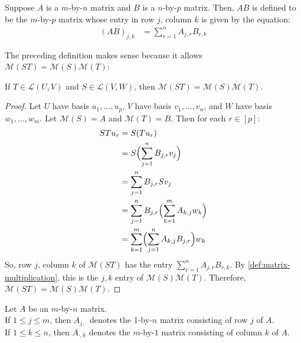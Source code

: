 \documentclass{article}
\begin{document}
\begin{definition}
  \label{def:matrix-multiplication}
  Suppose $A$ is a $m$-by-$n$ matrix and $B$ is a $n$-by-$p$
  matrix. Then, $AB$ is defined to be the $m$-by-$p$ matrix whose
  entry in row $j$, column $k$ is given by the equation:
  \begin{align*}
    (AB)_{j,k} &= \sum_{r=1}^n A_{j,r}B_{r,k}
  \end{align*}
\end{definition}

The preceding definition makes sense because it allows
$\mathcal{M}(ST) = \mathcal{M}(S)\mathcal{M}(T)$:

\begin{theorem}
  \label{thm:matrix-of-product-of-linear-maps}
  If $T \in \mathcal{L}(U, V)$ and $S \in \mathcal{L}(V, W)$, then
  $\mathcal{M}(ST) = \mathcal{M}(S)\mathcal{M}(T)$.
\end{theorem}
\begin{proof}
  Let $U$ have basis $u_1, ..., u_p$, $V$ have basis $v_1, ..., v_n$,
  and $W$ have basis $w_1, ..., w_m$. Let $\mathcal{M}(S) = A$ and
  $\mathcal{M}(T) = B$. Then for each $r \in [p]$:
  \begin{align*}
    STu_r &= S(Tu_r) \\
          &= S\Bigl( \sum_{j=1}^n B_{j,r}v_j \Bigr) \\
          &= \sum_{j=1}^n B_{j,r} Sv_j \\
          &= \sum_{j=1}^n B_{j, r} \Bigl( \sum_{k=1}^m A_{k, j} w_k \Bigr)
    \\
          &= \sum_{k=1}^m \Bigl( \sum_{j=1}^n A_{k,j}B_{j,r} \Bigr) w_k \\
  \end{align*}
  So, row $j$, column $k$ of $\mathcal{M}(ST)$ has the entry
  $\sum_{r=1}^n A_{j,r}B_{r,k}$. By
  \cref{def:matrix-multiplication}, this is the $j, k$ entry of
  $\mathcal{M}(S)\mathcal{M}(T)$. Therefore, $\mathcal{M}(ST) =
  \mathcal{M}(S) \mathcal{M}(T)$.
\end{proof}

\begin{definition}
  \label{def:slice-of-matrix}
  Let $A$ be an $m$-by-$n$ matrix. \\
  If $1 \le j \le m$, then $A_{j,\cdot}$ denotes the $1$-by-$n$ matrix
  consisting of row $j$ of $A$. \\
  If $1 \le k \le n$, then $A_{\cdot,k}$ denotes the $m$-by-$1$ matrix
  consisting of column $k$ of $A$.
\end{definition}
\end{document}
